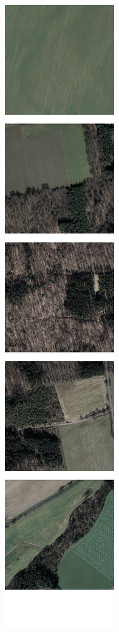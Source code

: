 \begin{figure}[h]
    \centering
    \newcommand{\VegetationImageWidth}{0.13\textwidth}

    \begin{subfigure}{\VegetationImageWidth}
        \includegraphics[width=\textwidth]{images/vegetation/original}

\end{subfigure}
\end{figure}
